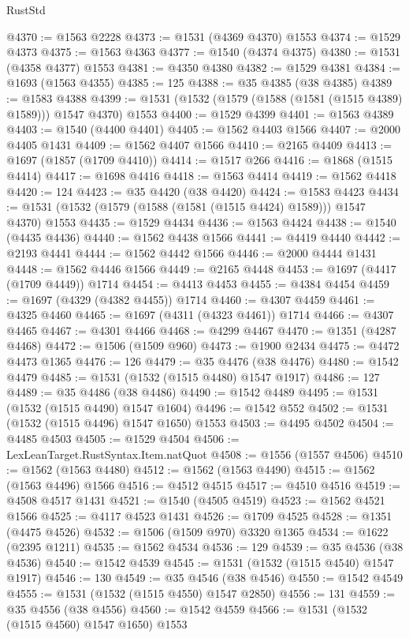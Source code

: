 \begin{lexlean}{RustStd}
\begin{coremodule}
{\begin{coremodule}
{{{{{{{{{{{{{{{{{{{{{{{{{{{{{{{{@4370 := @1563 @2228
@4373 := @1531 (@4369 @4370) @1553
@4374 := @1529 @4373
@4375 := @1563 @4363
@4377 := @1540 (@4374 @4375)
@4380 := @1531 (@4358 @4377) @1553
@4381 := @4350 @4380
@4382 := @1529 @4381
@4384 := @1693 (@1563 @4355)
@4385 := 125
@4388 := @35 @4385 (@38 @4385)
@4389 := @1583 @4388
@4399 := @1531 (@1532 (@1579 (@1588 (@1581 (@1515 @4389) @1589))) @1547 @4370) @1553
@4400 := @1529 @4399
@4401 := @1563 @4389
@4403 := @1540 (@4400 @4401)
@4405 := @1562 @4403 @1566
@4407 := @2000 @4405 @1431
@4409 := @1562 @4407 @1566
@4410 := @2165 @4409
@4413 := @1697 (@1857 (@1709 @4410))
@4414 := @1517 @266
@4416 := @1868 (@1515 @4414)
@4417 := @1698 @4416
@4418 := @1563 @4414
@4419 := @1562 @4418
@4420 := 124
@4423 := @35 @4420 (@38 @4420)
@4424 := @1583 @4423
@4434 := @1531 (@1532 (@1579 (@1588 (@1581 (@1515 @4424) @1589))) @1547 @4370) @1553
@4435 := @1529 @4434
@4436 := @1563 @4424
@4438 := @1540 (@4435 @4436)
@4440 := @1562 @4438 @1566
@4441 := @4419 @4440
@4442 := @2193 @4441
@4444 := @1562 @4442 @1566
@4446 := @2000 @4444 @1431
@4448 := @1562 @4446 @1566
@4449 := @2165 @4448
@4453 := @1697 (@4417 (@1709 @4449)) @1714
@4454 := @4413 @4453
@4455 := @4384 @4454
@4459 := @1697 (@4329 (@4382 @4455)) @1714
@4460 := @4307 @4459
@4461 := @4325 @4460
@4465 := @1697 (@4311 (@4323 @4461)) @1714
@4466 := @4307 @4465
@4467 := @4301 @4466
@4468 := @4299 @4467
@4470 := @1351 (@4287 @4468)
@4472 := @1506 (@1509 @960)
@4473 := @1900 @2434
@4475 := @4472 @4473 @1365
@4476 := 126
@4479 := @35 @4476 (@38 @4476)
@4480 := @1542 @4479
@4485 := @1531 (@1532 (@1515 @4480) @1547 @1917)
@4486 := 127
@4489 := @35 @4486 (@38 @4486)
@4490 := @1542 @4489
@4495 := @1531 (@1532 (@1515 @4490) @1547 @1604)
@4496 := @1542 @552
@4502 := @1531 (@1532 (@1515 @4496) @1547 @1650) @1553
@4503 := @4495 @4502
@4504 := @4485 @4503
@4505 := @1529 @4504
@4506 := LexLeanTarget.RustSyntax.Item.natQuot
@4508 := @1556 (@1557 @4506)
@4510 := @1562 (@1563 @4480)
@4512 := @1562 (@1563 @4490)
@4515 := @1562 (@1563 @4496) @1566
@4516 := @4512 @4515
@4517 := @4510 @4516
@4519 := @4508 @4517 @1431
@4521 := @1540 (@4505 @4519)
@4523 := @1562 @4521 @1566
@4525 := @4117 @4523 @1431
@4526 := @1709 @4525
@4528 := @1351 (@4475 @4526)
@4532 := @1506 (@1509 @970) @3320 @1365
@4534 := @1622 (@2395 @1211)
@4535 := @1562 @4534
@4536 := 129
@4539 := @35 @4536 (@38 @4536)
@4540 := @1542 @4539
@4545 := @1531 (@1532 (@1515 @4540) @1547 @1917)
@4546 := 130
@4549 := @35 @4546 (@38 @4546)
@4550 := @1542 @4549
@4555 := @1531 (@1532 (@1515 @4550) @1547 @2850)
@4556 := 131
@4559 := @35 @4556 (@38 @4556)
@4560 := @1542 @4559
@4566 := @1531 (@1532 (@1515 @4560) @1547 @1650) @1553
}}}}}}}}}}}}}}}}}}}}}}}}}}}}}}}}
\end{coremodule}}
\end{coremodule}
\end{lexlean}
